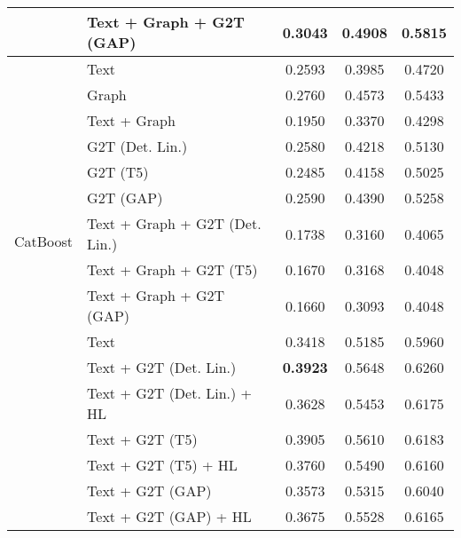 \begin{table}[htbp]
\begin{tabular}{l p{5cm} c c c}
        & Text + Graph + G2T (GAP) & 0.3043 & 0.4908 & 0.5815 \\
        \midrule
        \multirow{12}{*}{CatBoost} & Text & 0.2593 & 0.3985 & 0.4720 \\
        & Graph & 0.2760 & 0.4573 & 0.5433 \\
        & Text + Graph & 0.1950 & 0.3370 & 0.4298 \\
        & G2T (Det. Lin.) & 0.2580 & 0.4218 & 0.5130 \\
        & G2T (T5) & 0.2485 & 0.4158 & 0.5025 \\
        & G2T (GAP) & 0.2590 & 0.4390 & 0.5258 \\
        & Text + Graph + G2T (Det. Lin.) & 0.1738 & 0.3160 & 0.4065 \\
        & Text + Graph + G2T (T5) & 0.1670 & 0.3168 & 0.4048 \\
        & Text + Graph + G2T (GAP) & 0.1660 & 0.3093 & 0.4048 \\
        \midrule
        \multirow{10}{*}{MPNet} & Text & 0.3418 & 0.5185 & 0.5960 \\
        & Text + G2T (Det. Lin.) & \textbf{0.3923} & 0.5648 & 0.6260 \\
        & Text + G2T (Det. Lin.) + HL & 0.3628 & 0.5453 & 0.6175 \\
        & Text + G2T (T5) & 0.3905 & 0.5610 & 0.6183 \\
        & Text + G2T (T5) + HL & 0.3760 & 0.5490 & 0.6160 \\
        & Text + G2T (GAP) & 0.3573 & 0.5315 & 0.6040 \\
        & Text + G2T (GAP) + HL & 0.3675 & 0.5528 & 0.6165 \\
        \bottomrule
    \end{tabular}
\end{table}

